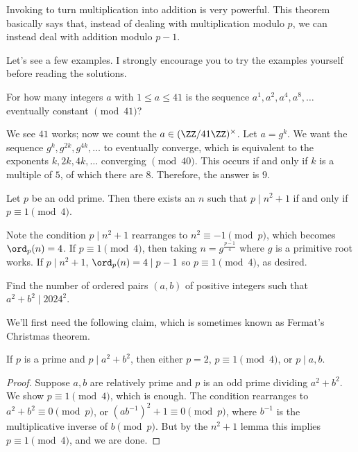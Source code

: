\documentclass[11pt]{scrartcl}
\begin{document}
Invoking  to turn multiplication into addition is very powerful. This theorem basically says that, instead of dealing with multiplication modulo $p$, we can instead deal with addition modulo $p - 1$.

Let's see a few examples. I strongly encourage you to try the examples yourself before reading the solutions.

\begin{example}
	For how many integers $a$ with $1 \le a \le 41$ is the sequence $a^1,a^2,a^4,a^8,\dots$ eventually constant $\pmod{41}$?
\end{example}

We see $41$ works; now we count the $a \in (\ZZ/41\ZZ)^\times$. Let $a = g^k$. We want the sequence $g^k,g^{2k},g^{4k},\dots$ to eventually converge, which is equivalent to the exponents $k,2k,4k,\dots$ converging $\pmod{40}$. This occurs if and only if $k$ is a multiple of $5$, of which there are $8$. Therefore, the answer is $9$.

\begin{example}[$n^2 + 1$ lemma]
	Let $p$ be an odd prime. Then there exists an $n$ such that $p \mid n^2 + 1$ if and only if $p \equiv 1 \pmod{4}$.
\end{example}

Note the condition $p \mid n^2 + 1$ rearranges to $n^2 \equiv -1 \pmod{p}$, which becomes $\ord_p(n) = 4$. If $p \equiv 1 \pmod{4}$, then taking $n = g^{\frac{p - 1}{4}}$ where $g$ is a primitive root works. If $p \mid n^2 + 1$, $\ord_p(n) = 4 \mid p - 1$ so $p \equiv 1 \pmod{4}$, as desired.

\begin{example}[SMT 2024/T8]
	Find the number of ordered pairs $(a,b)$ of positive integers such that $a^2 + b^2 \mid 2024^2$.
\end{example}

We'll first need the following claim, which is sometimes known as Fermat's Christmas theorem.

\begin{claim*}
	If $p$ is a prime and $p \mid a^2 + b^2$, then either $p = 2$, $p \equiv 1 \pmod{4}$, or $p \mid a,b$.
\end{claim*}

\begin{proof}
	Suppose $a,b$ are relatively prime and $p$ is an odd prime dividing $a^2 + b^2$. We show $p \equiv 1 \pmod{4}$, which is enough. The condition rearranges to $a^2 + b^2 \equiv 0 \pmod{p}$, or $(ab^{-1})^2 + 1 \equiv 0 \pmod{p}$, where $b^{-1}$ is the multiplicative inverse of $b \pmod{p}$. But by the $n^2 + 1$ lemma this implies $p \equiv 1 \pmod{4}$, and we are done.
\end{proof}
\end{document}
